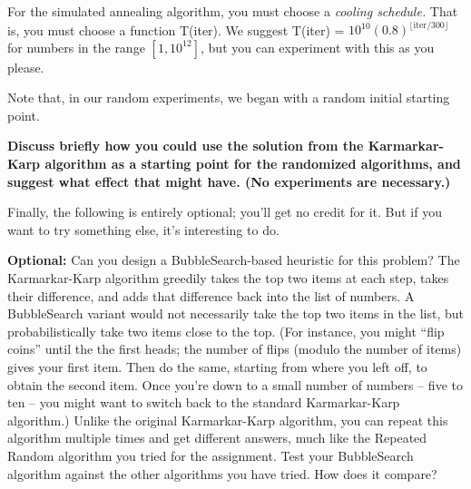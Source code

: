 \documentclass[11pt]{article}
\begin{document}
For the simulated annealing algorithm, you must choose a {\em cooling
schedule.}  That is, you must choose a function T(iter).  We suggest
T(iter) = $10^{10}(0.8)^{\lfloor \mbox{iter} / 300 \rfloor}$ for
numbers in the range $[1,10^{12}]$, but you can experiment with this
as you please.  

Note that, in our random experiments, we began with a random initial
starting point.

{\bf Discuss briefly how you could use the solution from the
Karmarkar-Karp algorithm as a starting point for the randomized
algorithms, and suggest what effect that might have. 
(No experiments are necessary.)}

\setlength{\fboxsep}{10pt}


Finally, the following is entirely optional;  you'll get no credit for it.
But if you want to try something else, it's interesting to do.

{\bf Optional:} Can you design a BubbleSearch-based heuristic for this
problem?
The Karmarkar-Karp algorithm greedily takes the top two items at each
step, takes their difference, and adds that difference back into the
list of numbers.  A BubbleSearch variant would not necessarily take
the top two items in the list, but probabilistically take two items
close to the top.  (For instance, you might ``flip coins'' until the
the first heads;  the number of flips (modulo the number of items) 
gives your first item.  Then do the same, starting from where you
left off, to obtain the second item.  Once you're down to a small
number of numbers -- five to ten -- you might want to switch back
to the standard Karmarkar-Karp algorithm.)  Unlike the original 
Karmarkar-Karp algorithm, you can repeat this algorithm multiple
times and get different answers, much like the Repeated Random algorithm
you tried for the assignment.  Test your BubbleSearch algorithm
against the other algorithms you have tried.  How does it compare?
\end{document}
